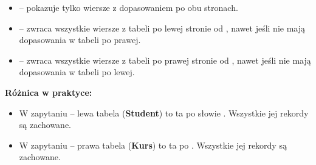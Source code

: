 \begin{tcolorbox}[gray={Opis}]
\begin{itemize}
    \item {} – pokazuje tylko wiersze z dopasowaniem po obu stronach.
    \item {} – zwraca wszystkie wiersze z tabeli po lewej stronie od , nawet jeśli nie mają dopasowania w tabeli po prawej.
    \item {} – zwraca wszystkie wiersze z tabeli po prawej stronie od , nawet jeśli nie mają dopasowania w tabeli po lewej.
\end{itemize}
\end{tcolorbox}

\textbf{Różnica w praktyce:}
\begin{itemize}
    \item W zapytaniu  – lewa tabela (\textbf{Student}) to ta po słowie . Wszystkie jej rekordy są zachowane.
    \item W zapytaniu  – prawa tabela (\textbf{Kurs}) to ta po . Wszystkie jej rekordy są zachowane.
\end{itemize}
